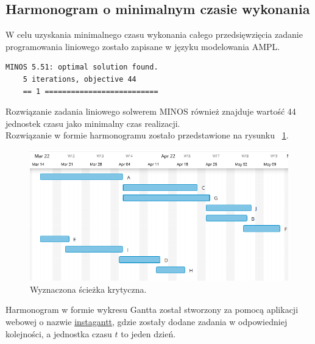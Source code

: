 \documentclass[
    12pt, %
]{../fphw}
\begin{document}
\subsection{Harmonogram o minimalnym czasie wykonania}
W celu uzyskania minimalnego czasu wykonania całego przedsięwzięcia zadanie programowania liniowego
zostało zapisane w języku modelowania AMPL.


\begin{lstlisting}[caption=Rozwiązanie znalezione solwerem minos]
    MINOS 5.51: optimal solution found.
    5 iterations, objective 44
    == 1 ==========================
\end{lstlisting}
Rozwiązanie zadania liniowego solwerem MINOS również znajduje wartość 44 jednostek czasu jako minimalny czas realizacji.
\\
Rozwiązanie w formie harmonogramu zostało przedstawione na rysunku ~\ref{fig:harmonogram}.
\begin{figure}[H]
    \centering
    \includegraphics[width=0.9\linewidth]{./img/harmonogram.PNG}
    \caption{Wyznaczona ścieżka krytyczna.}
    \label{fig:harmonogram}
\end{figure}
Harmonogram w formie wykresu Gantta został stworzony za pomocą aplikacji webowej o nazwie
\href{https://app.instagantt.com/}{instagantt}, gdzie zostały dodane zadania
w odpowiedniej kolejności, a jednostka czasu \(t\) to jeden dzień. 
\end{document}
